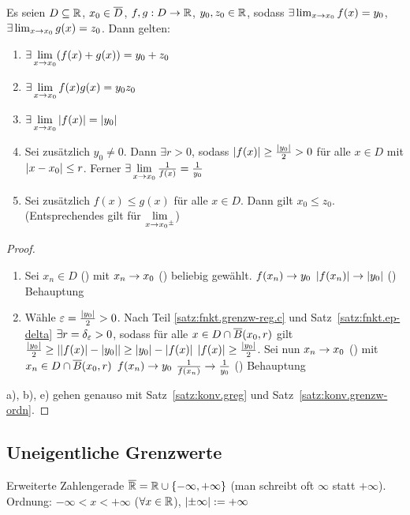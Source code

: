 \documentclass[12pt]{scrreprt}
\begin{document}
\begin{satz}\label{satz:fnkt.grenzw-reg}
Es seien $D \subseteq \mathbb{R}$, $x_0\in\overline{D}$, $f, g: D\rightarrow\mathbb{R}$, $y_0, z_0\in\mathbb{R}$, sodass $\exists \lim_{x\rightarrow x_0}f(x) = y_0$,
$\exists \lim_{x\rightarrow x_0}g(x) = z_0$. Dann gelten:
\begin{enumerate}
\item $\exists \lim\limits_{x\rightarrow x_0} (f(x) + g(x)) = y_0 + z_0$\label{satz:fnkt.grenzw-reg.a}
\item $\exists \lim\limits_{x\rightarrow x_0} f(x)g(x) = y_0z_0$\label{satz:fnkt.grenzw-reg.b}
\item $\exists \lim\limits_{x\rightarrow x_0} \left\lvert f(x)\right\lvert = \left\lvert y_0\right\lvert$\label{satz:fnkt.grenzw-reg.c}
\item Sei zusätzlich $y_0 \neq 0$. Dann $\exists r > 0$, sodass $\left\lvert f(x)\right\lvert \ge \frac{\left\lvert y_0\right\lvert}{2} > 0$ 
für alle $x\in D$ mit $\left\lvert x - x_0\right\lvert \le r$. Ferner $\exists \lim\limits_{x\rightarrow x_0} \frac{1}{f(x)} = \frac{1}{y_0}$\label{satz:fnkt.grenzw-reg.d}
\item Sei zusätzlich $f(x) \le g(x)$ für alle $x\in D$. Dann gilt $x_0 \le z_0$. (Entsprechendes gilt für $\lim\limits_{x\rightarrow {x_0}^\pm}$)\label{satz:fnkt.grenzw-reg.e}
\end{enumerate}
\end{satz}
\begin{proof}
\begin{enumerate} %
\item Sei $x_n \in D$ () mit $x_n\rightarrow x_0$ (\ninf) beliebig gewählt.  $f(x_n) \rightarrow y_0$ 
\folgtnach{\ref{satz:konv.grenzw-komplex}} $\left\lvert f(x_n)\right\lvert \rightarrow \left\lvert y_0\right\lvert$ (\ninf) \folgt Behauptung
\item Wähle $\varepsilon = \frac{\left\lvert y_0\right\lvert}{2} > 0$. Nach Teil \ref{satz:fnkt.grenzw-reg.c} und Satz~\ref{satz:fnkt.ep-delta}
$\exists r=\delta_\varepsilon > 0$, sodass für alle $x\in D\cap\overline{B}(x_0, r)$ gilt $\frac{\left\lvert y_0\right\lvert}{2} \ge \left\lvert\left\lvert f(x)\right\lvert - \left\lvert y_0\right\lvert\right\lvert \ge \left\lvert y_0\right\lvert - \left\lvert f(x)\right\lvert$
\gdw $\left\lvert f(x)\right\lvert \ge \frac{\left\lvert y_0\right\lvert}{2}$. Sei nun $x_n\rightarrow x_0$ (\ninf) mit $x_n \in D \cap \overline{B}(x_0, r)$
 $f(x_n) \rightarrow y_0$ \folgtnach{\ref{satz:konv.greg}} $\frac{1}{f(x_n)} \rightarrow \frac{1}{y_0}$ (\ninf) \folgt Behauptung
\end{enumerate}

\noindent a), b), e) gehen genauso mit Satz~\ref{satz:konv.greg} und Satz~\ref{satz:konv.grenzw-ordn}.
\end{proof}

\subsection*{Uneigentliche Grenzwerte}
\begin{dfn*}
Erweiterte Zahlengerade $\overline{\mathbb{R}} = \mathbb{R} \cup \{-\infty, +\infty\}$ (man schreibt
oft $\infty$ statt $+\infty$). Ordnung: $-\infty < x < +\infty$ ($\forall x\in\mathbb{R}$), $\left\lvert\pm\infty\right\lvert := +\infty$
\end{dfn*}
\end{document}
